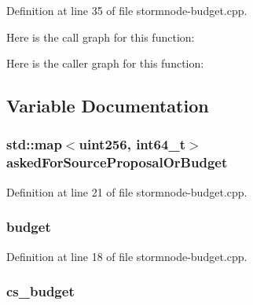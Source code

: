Definition at line 35 of file stormnode-\/budget.\+cpp.



Here is the call graph for this function\+:




Here is the caller graph for this function\+:




\subsection{Variable Documentation}
\hypertarget{stormnode-budget_8cpp_adc8d4231410936249a05d634e33b44d3}{}
\subsubsection[{asked\+For\+Source\+Proposal\+Or\+Budget}]{\setlength{\rightskip}{0pt plus 5cm}std\+::map$<${\bf uint256}, {\bf int64\+\_\+t}$>$ asked\+For\+Source\+Proposal\+Or\+Budget}\label{stormnode-budget_8cpp_adc8d4231410936249a05d634e33b44d3}


Definition at line 21 of file stormnode-\/budget.\+cpp.

\hypertarget{stormnode-budget_8cpp_ad9842d355854ad5602728a96cf684706}{}
\subsubsection[{budget}]{ budget}\label{stormnode-budget_8cpp_ad9842d355854ad5602728a96cf684706}


Definition at line 18 of file stormnode-\/budget.\+cpp.

\hypertarget{stormnode-budget_8cpp_a2343791d00e01ac44a133ed313432d92}{}
\subsubsection[{cs\+\_\+budget}]{ cs\+\_\+budget}\label{stormnode-budget_8cpp_a2343791d00e01ac44a133ed313432d92}


